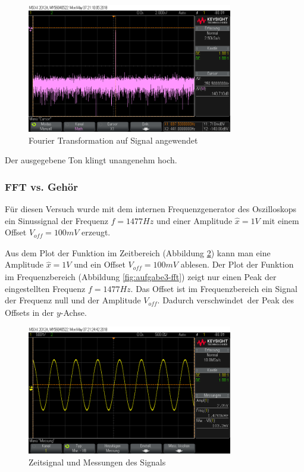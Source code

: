 \documentclass[a4paper]{article}
\begin{document}
\begin{figure}[H]
    \centering
    \includegraphics[width=0.8\textwidth]{aufgabe1_fft.png}
    \caption{Fourier Transformation auf Signal angewendet}
    \label{fig:aufgabe1-fft}
\end{figure}

Der ausgegebene Ton klingt unangenehm hoch.

\subsubsection{FFT vs. Gehör}
Für diesen Versuch wurde mit dem internen Frequenzgenerator des Oszilloskops ein Sinussignal der Frequenz $f=1477\si{Hz}$ und einer Amplitude $\hat{x}=1\si{V}$ mit einem Offset $V_{\textit{off}}=100\si{mV}$ erzeugt.

Aus dem Plot der Funktion im Zeitbereich (Abbildung \ref{fig:aufgabe2-time}) kann man eine Amplitude $\hat{x}=1\si{V}$ und ein Offset $V_{\textit{off}}=100\si{mV}$ ablesen. Der Plot der Funktion im Frequenzbereich (Abbildung \ref{fig:aufgabe3-fft}) zeigt nur einen Peak der eingestellten Frequenz $f=1477\si{Hz}$.
Das Offset ist im Frequenzbereich ein Signal der Frequenz null und der Amplitude $V_{\textit{off}}$. Dadurch \glqq verschwindet\grqq\ der Peak des Offsets in der $y$-Achse.

\begin{figure}[H]
    \centering
    \includegraphics[width=0.8\textwidth]{aufgabe2_time.png}
    \caption{Zeitsignal und Messungen des Signals}
    \label{fig:aufgabe2-time}
\end{figure}
\end{document}
